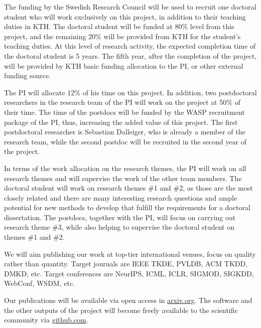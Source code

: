 \documentclass[a4paper,11pt]{article}
\begin{document}
The funding by the Swedish Research Council will be used to recruit 
one doctoral student who will work exclusively on this project, 
in addition to their teaching duties in KTH.
The doctoral student will be funded at 80\% level from this project, 
and the remaining 20\% will be provided from KTH for the student's teaching duties. 
At this level of research activity, the expected completion time of the doctoral student is 5 years. 
The fifth year, after the completion of the project, 
will be provided by KTH basic funding allocation to the PI, or other external funding source. 

The PI will allocate 12\% of his time on this project.
In addition, two postdoctoral researchers in the research team of the PI
will work on the project at 50\% of their time. 
The time of the postdocs will be funded by the WASP recruitment package of the PI, 
thus, increasing the added value of this project.
The first postdoctoral researcher is Sebastian Dalleiger, 
who is already a member of the research team, 
while the second postdoc will be recruited in the second year of the project.

In terms of the work allocation on the research themes, 
the PI will work on all research themes and will supervise the work of the other team members. 
The doctoral student will work on research themes \#1 and \#2, 
as those are the most closely related and there are many interesting research questions
and ample potential for new methods to develop that fulfill the requirements for a doctoral dissertation. 
The postdocs, together with the PI, will focus on carrying out research theme \#3,
while also helping to supervise the doctoral student on themes \#1 and \#2.

We will aim publishing our work at top-tier international venues, 
focus on quality rather than quantity.
% 
Target journals 
are IEEE TKDE, PVLDB, ACM TKDD,  DMKD, etc. 
Target conferences are NeurIPS, ICML, ICLR, SIGMOD, SIGKDD, WebConf, WSDM, etc.

Our publications will be available via open access in {\small\url{arxiv.org}}. 
The software and the other outputs of the project 
will become freely available to the scientific community via {\small\url{github.com}}. %
\end{document}
